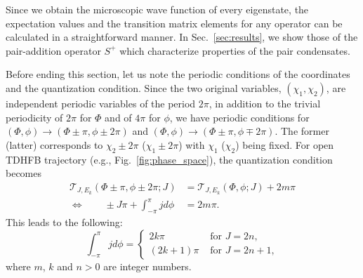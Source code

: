 \documentclass[11pt]{book} %
\begin{document}
Since we obtain the microscopic wave function of every eigenstate,
the expectation values and the transition matrix elements for any operator
can be calculated in a straightforward manner.
In Sec.~\ref{sec:results}, we show those of the pair-addition operator
$S^+$ which characterize properties of the pair condensates.

Before ending this section, let us note the periodic conditions
of the coordinates and the quantization condition.
Since the two original variables, $(\chi_1,\chi_2)$,
are independent periodic variables of the period $2\pi$,
in addition to the trivial periodicity of $2\pi$ for $\Phi$ and of $4\pi$
for $\phi$,
we have periodic conditions for
$(\Phi,\phi)\rightarrow (\Phi\pm \pi,\phi\pm 2\pi)$ and
$(\Phi,\phi)\rightarrow (\Phi\pm \pi,\phi\mp 2\pi)$.
The former (latter) corresponds to $\chi_2\pm 2\pi$ ($\chi_1\pm 2\pi$)
with $\chi_1$ ($\chi_2$) being fixed.
For open TDHFB trajectory (e.g., Fig.~\ref{fig:phase_space}),
the quantization condition becomes
\begin{align}
 \mathcal{T}_{J,E_k}(\Phi\pm\pi,\phi\pm 2\pi;J) &= \mathcal{T}_{J,E_k}(\Phi,\phi;J) + 2m\pi \nonumber \\
	 \Leftrightarrow \quad\quad \pm J \pi + \int_{-\pi}^\pi j d\phi
	&= 2m\pi .
\end{align}
This leads to the following:
\begin{equation}
	\int_{-\pi}^\pi j d\phi = 
	\begin{cases}
		2k\pi & \mbox{ for } J=2n ,\\
		(2k+1)\pi & \mbox{ for } J=2n+1 ,
	\end{cases}
	\label{EBK_2}
\end{equation}
where $m$, $k$ and $n>0$ are integer numbers.
\end{document}
